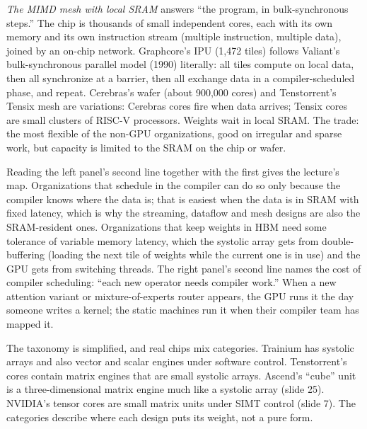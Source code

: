 \documentclass[11pt,letterpaper]{article}
\begin{document}
\emph{The MIMD mesh with local SRAM} answers ``the program, in bulk-synchronous steps.'' The chip is thousands of small independent cores, each with its own memory and its own instruction stream (multiple instruction, multiple data), joined by an on-chip network. Graphcore's IPU (1{,}472 tiles) follows Valiant's bulk-synchronous parallel model (1990) literally: all tiles compute on local data, then all synchronize at a barrier, then all exchange data in a compiler-scheduled phase, and repeat. Cerebras's wafer (about 900{,}000 cores) and Tenstorrent's Tensix mesh are variations: Cerebras cores fire when data arrives; Tensix cores are small clusters of RISC-V processors. Weights wait in local SRAM. The trade: the most flexible of the non-GPU organizations, good on irregular and sparse work, but capacity is limited to the SRAM on the chip or wafer.

Reading the left panel's second line together with the first gives the lecture's map. Organizations that schedule in the compiler can do so only because the compiler knows where the data is; that is easiest when the data is in SRAM with fixed latency, which is why the streaming, dataflow and mesh designs are also the SRAM-resident ones. Organizations that keep weights in HBM need some tolerance of variable memory latency, which the systolic array gets from double-buffering (loading the next tile of weights while the current one is in use) and the GPU gets from switching threads. The right panel's second line names the cost of compiler scheduling: ``each new operator needs compiler work.'' When a new attention variant or mixture-of-experts router appears, the GPU runs it the day someone writes a kernel; the static machines run it when their compiler team has mapped it.

The taxonomy is simplified, and real chips mix categories. Trainium has systolic arrays and also vector and scalar engines under software control. Tenstorrent's cores contain matrix engines that are small systolic arrays. Ascend's ``cube'' unit is a three-dimensional matrix engine much like a systolic array (slide 25). NVIDIA's tensor cores are small matrix units under SIMT control (slide 7). The categories describe where each design puts its weight, not a pure form.
\end{document}
